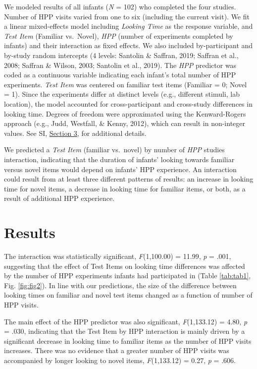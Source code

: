 \documentclass[
  english,
  man,man,floatsintext]{apa6}
\begin{document}
We modeled results of all infants (\emph{N} = 102) who completed the four studies. Number of HPP visits varied from one to six (including the current visit). We fit a linear mixed-effects model including \emph{Looking Time} as the response variable, and \emph{Test Item} (Familiar vs.~Novel), \emph{HPP} (number of experiments completed by infants) and their interaction as fixed effects. We also included by-participant and by-study random intercepts (4 levels: Santolin \& Saffran, 2019; Saffran et al., 2008; Saffran \& Wilson, 2003; Santolin et al., 2019). The \emph{HPP} predictor was coded as a continuous variable indicating each infant's total number of HPP experiments. \emph{Test Item} was centered on familiar test items (Familiar = 0; Novel = 1). Since the experiments differ at distinct levels (e.g., different stimuli, lab location), the model accounted for cross-participant and cross-study differences in looking time. Degrees of freedom were approximated using the Kenward-Rogers approach (e.g., Judd, Westfall, \& Kenny, 2012), which can result in non-integer values. See SI, \protect\hyperlink{s3}{Section 3}, for additional details.

We predicted a \emph{Test Item} (familiar vs.~novel) by number of \emph{HPP} studies interaction, indicating that the duration of infants' looking towards familiar versus novel items would depend on infants' HPP experience. An interaction could result from at least three different patterns of results: an increase in looking time for novel items, a decrease in looking time for familiar items, or both, as a result of additional HPP experience.

\hypertarget{results}{%
\section{Results}\label{results}}

The interaction was statistically significant, \emph{F}(1,100.00) = 11.99, \emph{p} = .001, suggesting that the effect of Test Items on looking time differences was affected by the number of HPP experiments infants had participated in (Table \ref{tab:tab1}, Fig. \ref{fig:fig2}). In line with our predictions, the size of the difference between looking times on familiar and novel test items changed as a function of number of HPP visits.

The main effect of the HPP predictor was also significant, \emph{F}(1,133.12) = 4.80, \emph{p} = .030, indicating that the Test Item by HPP interaction is mainly driven by a significant decrease in looking time to familiar items as the number of HPP visits increases. There was no evidence that a greater number of HPP visits was accompanied by longer looking to novel items, \emph{F}(1,133.12) = 0.27, \emph{p} = .606.
\end{document}

